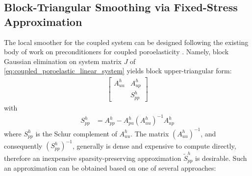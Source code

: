 \subsection{Block-Triangular Smoothing via Fixed-Stress Approximation}
\label{subsec:coupled_smoothing}

The local smoother for the coupled system can be designed following the existing body of work on preconditioners for coupled poroelasticity \cite{White2011,White2015,Castelletto2015,Castelletto2019}.   Namely, block Gaussian elimination on system matrix $J$ of \eqref{eq:coupled_poroelastic_linear_system} yields block upper-triangular form:
\begin{align}
    \begin{bmatrix}
        A_{uu}^h & A_{up}^h \\
                 & S_{pp}^h
    \end{bmatrix}
    \label{eq:coupled_poroelastic_schur_system}
\end{align}
with
\begin{align}
    S_{pp}^h &= A_{pp}^h - A_{pu}^h (A_{uu}^h)^{-1} A_{up}^h \label{eq:coupled_poroelastic_schur_complement}
\end{align}
where $S_{pp}^h$ is the Schur complement of $A_{uu}^h$.   The matrix $(A_{uu}^h)^{-1}$, and consequently $(S_{pp}^h)^{-1}$, generally is dense and expensive to compute directly, therefore an inexpensive sparsity-preserving approximation $\tilde{S}_{pp}^h$ is desirable.   Such an approximation can be obtained based on one of several approaches:
